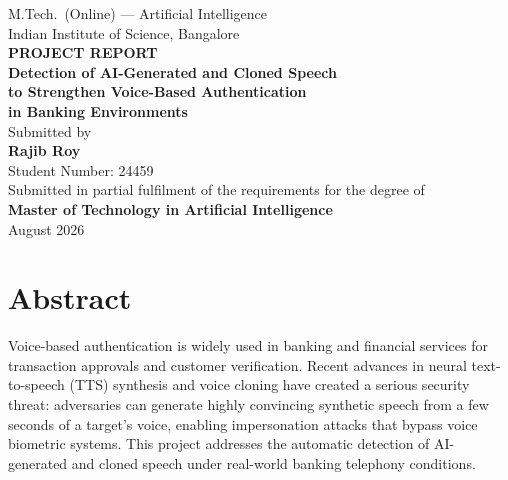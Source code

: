 \documentclass[12pt, a4paper, oneside]{report}
\begin{document}
\begin{titlepage}
\begin{center}
\vspace*{1cm}

{\large M.Tech.\ (Online) --- Artificial Intelligence}\\[4pt]
{\large Indian Institute of Science, Bangalore}\\[2cm]

{\Huge\bfseries\color{headerblue} PROJECT REPORT}\\[1.1cm]

{\LARGE\bfseries Detection of AI-Generated and Cloned Speech\\[6pt]
to Strengthen Voice-Based Authentication\\[6pt]
in Banking Environments}\\[2.5cm]

{\large Submitted by}\\[8pt]
{\Large\bfseries Rajib Roy}\\[6pt]
{\large Student Number: 24459}\\[3cm]

{\large Submitted in partial fulfilment of the requirements for the degree of}\\[8pt]
{\large\bfseries Master of Technology in Artificial Intelligence}\\[3cm]

{\large August 2026}

\end{center}
\end{titlepage}

\chapter*{Abstract}

Voice-based authentication is widely used in banking and financial services for transaction approvals and customer verification. Recent advances in neural text-to-speech (TTS) synthesis and voice cloning have created a serious security threat: adversaries can generate highly convincing synthetic speech from a few seconds of a target's voice, enabling impersonation attacks that bypass voice biometric systems. This project addresses the automatic detection of AI-generated and cloned speech under real-world banking telephony conditions.
\end{document}
